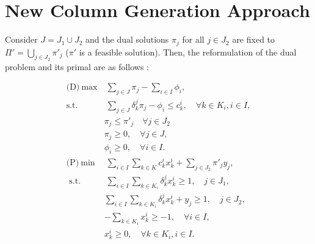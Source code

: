 \documentclass[12pt]{article}
\begin{document}
	
	\section{New Column Generation Approach}
	Consider $J = J_1 \cup J_2$ and the dual solutions $\pi_j$ for all $j \in J_2$ are fixed to $\Pi' = \bigcup_{j \in J_2} \pi'_j$ ($\pi'$ is a feasible solution). Then, the reformulation of the dual problem and its primal are as follows : 
	
	\begin{align*}
		\text{(D)}~   \max& ~ \sum _ { j \in J } \pi _ { j } - \sum _ { i \in I } \phi _ { i }, \\
	\text{s.t. } & ~ \sum _ { j \in J } \delta _ { k } ^ { j } \pi _ { j } - \phi _ { i } \leq c _ { k } ^ { i } , \quad \forall k \in K _ { i } , i \in I, \\
	& \pi_j \leq \pi'_j \quad \forall j \in J_2 \\
	&\pi _ { j } \geq 0 , \quad \forall j \in J ,\\
	&\phi _ { i } \geq 0 , \quad \forall i \in I. \\[5mm]
	\text{(P)}~ \min& ~ \sum _ { i \in I } \sum _ { k \in K } c _ { k } ^ { i } x _ { k } ^ { i } + \sum_{ j \in J_2 } \pi'_j y_j,\\
	\text { s.t. }&  ~ \sum _ { i \in I } \sum _ { k \in K _ { i } } \delta _ { k } ^ { j } x _ { k } ^ { i } \geq 1 , \quad j \in J_1, \\
	& \sum _ { i \in I } \sum _ { k \in K _ { i } } \delta _ { k } ^ { j } x _ { k } ^ { i } + y_j \geq 1 , \quad j \in J_2, \\
	&- \sum _ { k \in K _ { i } } x _ { k } ^ { i } \geq - 1 , \quad \forall i \in I ,\\
	&x _ { k } ^ { i } \geq 0 , \quad \forall k \in K _ { i } , i \in I .	
	\end{align*}
	
	
\end{document}
